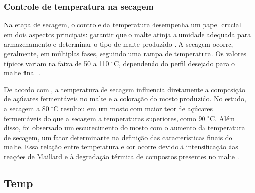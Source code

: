 \subsubsection{Controle de temperatura na secagem}

Na etapa de secagem, o controle da temperatura desempenha um papel crucial em dois aspectos principais: garantir que o malte atinja a umidade adequada para armazenamento e determinar o tipo de malte produzido \cite{KUNZE1996}. A secagem ocorre, geralmente, em múltiplas fases, seguindo uma rampa de temperatura. Os valores típicos variam na faixa de 50 a 110 $^{\circ}$C, dependendo do perfil desejado para o malte final \cite{LEWIS2012}.

De acordo com , a temperatura de secagem influencia diretamente a composição de açúcares fermentáveis no malte e a coloração do mosto produzido. No estudo, a secagem a 80 $^{\circ}$C resultou em um mosto com maior teor de açúcares fermentáveis do que a secagem a temperaturas superiores, como 90 $^{\circ}$C. Além disso, foi observado um escurecimento do mosto com o aumento da temperatura de secagem, um fator determinante na definição das características finais do malte. Essa relação entre temperatura e cor ocorre devido à intensificação das reações de Maillard e à degradação térmica de compostos presentes no malte \cite{KUNZE1996}.

\subsection{Temp}
